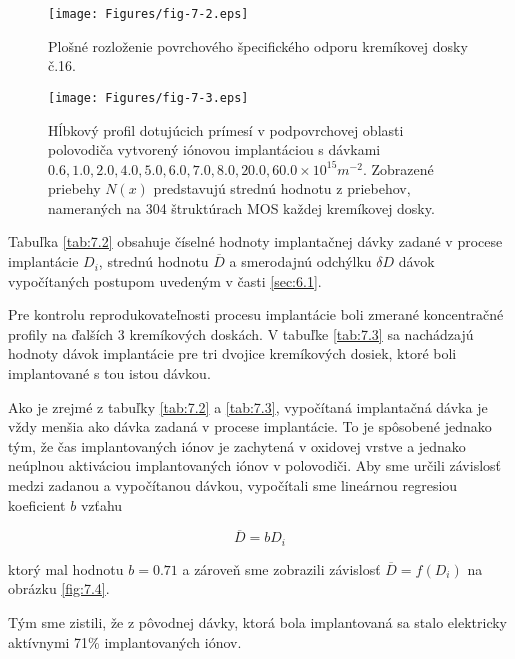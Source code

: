 \begin{figure}[h!]\centering
\texttt{[image: Figures/fig-7-2.eps]}
\captionsetup{justification=raggedright, singlelinecheck=false}
{\caption[Plošné rozloženie povrchového špecifického odporu kremíkovej
    dosky č.16]{Plošné rozloženie povrchového špecifického odporu
    kremíkovej dosky č.16.}\label{fig:7.2}}
\end{figure}

\begin{figure}[h!]\centering
\texttt{[image: Figures/fig-7-3.eps]}
\captionsetup{justification=raggedright, singlelinecheck=false}
{\caption[Hĺbkový profil dotujúcich prímesí]{Hĺbkový profil dotujúcich
    prímesí v podpovrchovej oblasti polovodiča vytvorený iónovou
    implantáciou s dávkami $0.6, 1.0, 2.0, 4.0, 5.0, 6.0, 7.0, 8.0,
    20.0, 60.0 \times 10^{15} m^{-2}$. Zobrazené priebehy $N(x)$
    predstavujú strednú hodnotu z priebehov, nameraných na 304
    štruktúrach MOS každej kremíkovej dosky.} \label{fig:7.3}}
\end{figure}

Tabuľka \ref{tab:7.2} obsahuje číselné hodnoty implantačnej dávky
zadané v procese implantácie $D_{i}$, strednú hodnotu $\overline D$ a
smerodajnú odchýlku $\delta D$ dávok vypočítaných postupom uvedeným v
časti \ref{sec:6.1}.

Pre kontrolu reprodukovateľnosti procesu implantácie boli zmerané
koncentračné profily na ďalších 3 kremíkových doskách.  V tabuľke
\ref{tab:7.3} sa nachádzajú hodnoty dávok implantácie pre tri dvojice
kremíkových dosiek, ktoré boli implantované s tou istou dávkou.

Ako je zrejmé z tabuľky \ref{tab:7.2} a \ref{tab:7.3}, vypočítaná
implantačná dávka je vždy menšia ako dávka zadaná v procese
implantácie.  To je spôsobené jednako tým, že čas implantovaných iónov
je zachytená v oxidovej vrstve a jednako neúplnou aktiváciou
implantovaných iónov v polovodiči. Aby sme určili závislosť medzi
zadanou a vypočítanou dávkou, vypočítali sme lineárnou regresiou
koeficient $b$ vzťahu

\begin{equation}\label{eq:7.1}
\overline D = b D_{i}
\end{equation}

ktorý mal hodnotu $b = 0.71$ a zároveň sme zobrazili závislosť
$\overline D = f(D_{i})$ na obrázku \ref{fig:7.4}.

Tým sme zistili, že z pôvodnej dávky, ktorá bola implantovaná sa stalo
elektricky aktívnymi 71\% implantovaných iónov.

